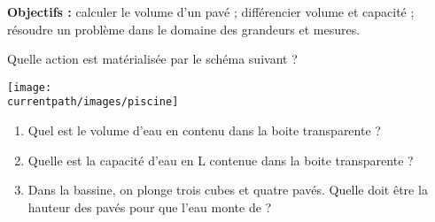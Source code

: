 \vspace*{-10mm}
\begin{enigme}
    {\bf Objectifs :} calculer le volume d'un pavé ; différencier volume et capacité ; résoudre un problème dans le domaine des grandeurs et mesures. 
 
       \partie[observations]
          Quelle action est matérialisée par le schéma suivant ? 
          \par\dotfill 
          \par\dotfill 
          \begin{center}
             \texttt{[image: \\currentpath/images/piscine]}
          \end{center}
       \partie[questions]
          \begin{enumerate}
             \item Quel est le volume d'eau en \Vol[cm]{} contenu dans la boite transparente ?  
                \par\medskip\dotfill 
             \item Quelle est la capacité d'eau en L contenue dans la boite transparente ?  
                \par\medskip\dotfill 
             \item Dans la bassine, on plonge trois cubes et quatre pavés. Quelle doit être la hauteur des pavés pour que l'eau monte de  ? 
                \par\medskip\dotfill  
                \par\medskip\dotfill  
                \par\medskip\dotfill
          \end{enumerate}
 
\end{enigme}  
%     
